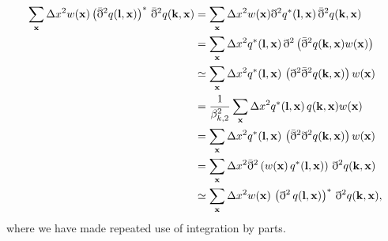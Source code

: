 \documentclass[a4paper,11pt]{article}
\newcommand{\summ}[1]{\sum_{\bf #1}\Delta #1^2}
\begin{document}
    \begin{align}
      \summ{x}w({\bf x})\left(\bar{\eth}^2q({\bf l},{\bf x})\right)^*\,\bar{\eth}^2q({\bf k},{\bf x})
      &=\summ{x}w({\bf x})\eth^2 q^*({\bf l},{\bf x})\,\bar{\eth}^2q({\bf k},{\bf x})\\
      &=\summ{x}q^*({\bf l},{\bf x})\,\eth^2\left(\bar{\eth}^2q({\bf k},{\bf x})w({\bf x})\right)\\
      &\simeq\summ{x}q^*({\bf l},{\bf x})\,\left(\eth^2\bar{\eth}^2q({\bf k},{\bf x})\right)w({\bf x})\\
      &=\frac{1}{\beta^2_{k,2}}\summ{x}q^*({\bf l},{\bf x})\,q({\bf k},{\bf x})w({\bf x})\\
      &=\summ{x}q^*({\bf l},{\bf x})\,\left(\bar{\eth}^2\eth^2q({\bf k},{\bf x})\right)w({\bf x})\\
      &=\summ{x}\bar{\eth}^2\left(w({\bf x})\,q^*({\bf l},{\bf x})\right)\,\eth^2q({\bf k},{\bf x})\\
      &\simeq\summ{x}w({\bf x})\,\left(\eth^2\,q({\bf l},{\bf x})\right)^*\,\eth^2q({\bf k},{\bf x}),
    \end{align}
    where we have made repeated use of integration by parts.
    
\end{document}

